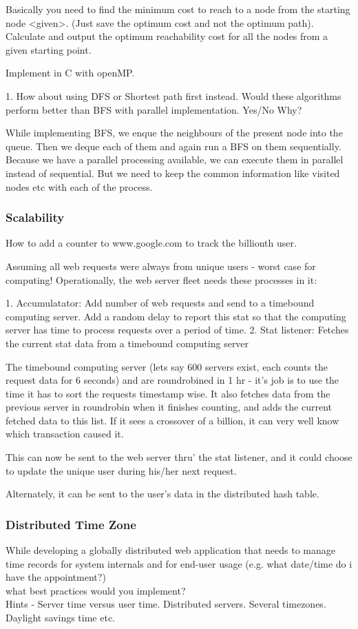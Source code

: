 Basically you need to find the minimum cost to reach to a node from the starting node <given>. (Just save the optimum cost and not the optimum path). Calculate and output the 
optimum reachability cost for all the nodes from a given starting point. 

Implement in C with openMP. 

1. How about using DFS or Shortest path first instead. Would these algorithms perform better than BFS with parallel implementation. Yes/No Why?

While implementing BFS, we enque the neighbours of the present node into the queue. Then we deque each of them and again run a BFS on them sequentially. Because we have a parallel 
processing available, we can execute them in parallel instead of sequential. But we need to keep the common information like visited nodes etc with each of the process.

\subsubsection{Scalability}
How to add a counter to www.google.com to track the billionth user.

Assuming all web requests were always from unique users - worst case for computing! Operationally, the web server fleet needs these processes in it: 

1. Accumulatator: Add number of web requests and send to a timebound computing server. Add a random delay to report this stat so that the computing server has time to process 
requests over a period of time. 
2. Stat listener: Fetches the current stat data from a timebound computing server 

The timebound computing server (lets say 600 servers exist, each counts the request data for 6 seconds) and are roundrobined in 1 hr - it's job is to use the time it has to sort 
the requests timestamp wise. It also fetches data from the previous server in roundrobin when it finishes counting, and adds the current fetched data to this list. If it sees a 
crossover of a billion, it can very well know which transaction caused it. 

This can now be sent to the web server thru' the stat listener, and it could choose to update the unique user during his/her next request. 

Alternately, it can be sent to the user's data in the distributed hash table.

\subsubsection{Distributed Time Zone}
While developing a globally distributed web application that needs to manage time records for system internals 
and for end-user usage (e.g. what date/time do i have the appointment?) \\
what best practices would you implement? \\
Hints - Server time versus user time. Distributed servers. Several timezones. Daylight savings time etc.

